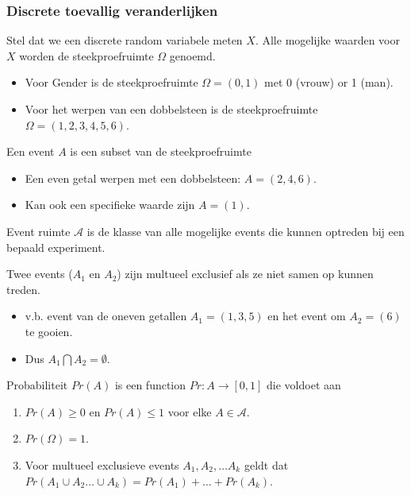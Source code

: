 \documentclass[
  12pt,dutch,coursenotes]{book}
\providecommand{\tightlist}{%
  \setlength{\itemsep}{0pt}\setlength{\parskip}{0pt}}
\begin{document}
\hypertarget{discrete-toevallig-veranderlijken}{%
\subsubsection{Discrete toevallig veranderlijken}\label{discrete-toevallig-veranderlijken}}

Stel dat we een discrete random variabele meten \(X\). Alle mogelijke waarden voor \(X\) worden de steekproefruimte \(\Omega\) genoemd.

\begin{itemize}
\item
  Voor Gender is de steekproefruimte \(\Omega=(0,1)\) met 0 (vrouw) or 1 (man).
\item
  Voor het werpen van een dobbelsteen is de steekproefruimte \(\Omega=(1,2,3,4,5,6)\).
\end{itemize}

Een event \(A\) is een subset van de steekproefruimte

\begin{itemize}
\tightlist
\item
  Een even getal werpen met een dobbelsteen: \(A=(2,4,6)\).
\item
  Kan ook een specifieke waarde zijn \(A=(1)\).
\end{itemize}

Event ruimte \(\mathcal{A}\) is de klasse van alle mogelijke events die kunnen optreden bij een bepaald experiment.

Twee events (\(A_1\) en \(A_2\)) zijn multueel exclusief als ze niet samen op kunnen treden.

\begin{itemize}
\tightlist
\item
  v.b. event van de oneven getallen \(A_1=(1,3,5)\) en het event om \(A_2=(6)\) te gooien.
\item
  Dus \(A_1 \bigcap A_2=\emptyset\).
\end{itemize}

Probabiliteit \(Pr(A)\) is een function \(Pr: A \rightarrow [0,1]\) die voldoet aan

\begin{enumerate}
\def\labelenumi{\arabic{enumi}.}
\tightlist
\item
  \(Pr(A) \geq 0\) en \(Pr(A) \leq 1\) voor elke \(A \in \mathcal{A}\).
\item
  \(Pr(\Omega)=1\).
\item
  Voor multueel exclusieve events \(A_1, A_2, \ldots A_k\) geldt dat \(Pr(A_1 \cup A_2 \ldots \cup A_k)= Pr(A_1) + \ldots + Pr(A_k)\).
\end{enumerate}
\end{document}
